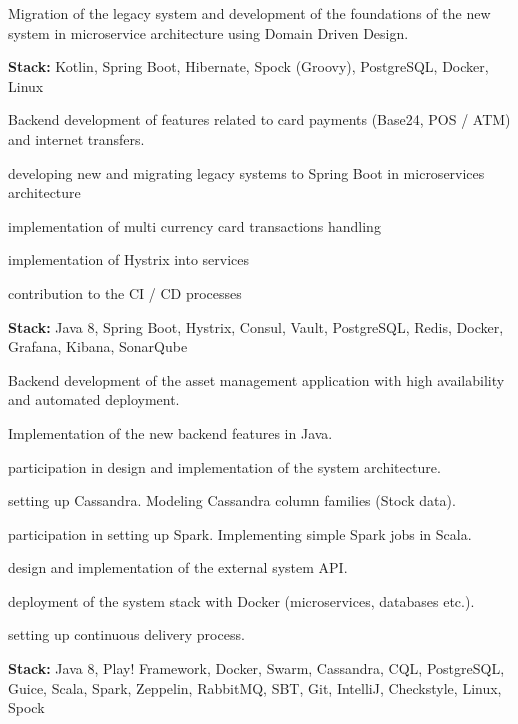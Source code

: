 Migration of the legacy system and development of the foundations of the new system in microservice architecture using Domain Driven Design.

\textbf{Stack:} Kotlin, Spring Boot, Hibernate, Spock (Groovy), PostgreSQL, Docker, Linux
\sectionsep

Backend development of features related to card payments (Base24, POS / ATM) and internet transfers. 
\begin{tightemize}
\item developing new and migrating legacy systems to Spring Boot in microservices architecture
\item implementation of multi currency card transactions handling
\item implementation of Hystrix into services
\item contribution to the CI / CD processes
\end{tightemize}

\textbf{Stack:} Java 8, Spring Boot, Hystrix, Consul, Vault, PostgreSQL, Redis, Docker, Grafana, Kibana, SonarQube
\sectionsep

Backend development of the asset management application with high availability and automated deployment.
\begin{tightemize}
\item Implementation of the new backend features in Java.
\item participation in design and implementation of the system architecture. 
\item setting up Cassandra. Modeling Cassandra column families (Stock data).
\item participation in setting up Spark. Implementing simple Spark jobs in Scala. 
\item design and implementation of the external system API.
\item deployment of the system stack with Docker (microservices, databases etc.).
\item setting up continuous delivery process.
\end{tightemize}

\textbf{Stack:} Java 8, Play! Framework, Docker, Swarm, Cassandra, CQL, PostgreSQL, Guice, Scala, Spark, Zeppelin, RabbitMQ, SBT, Git, IntelliJ, Checkstyle, Linux, Spock
\sectionsep

